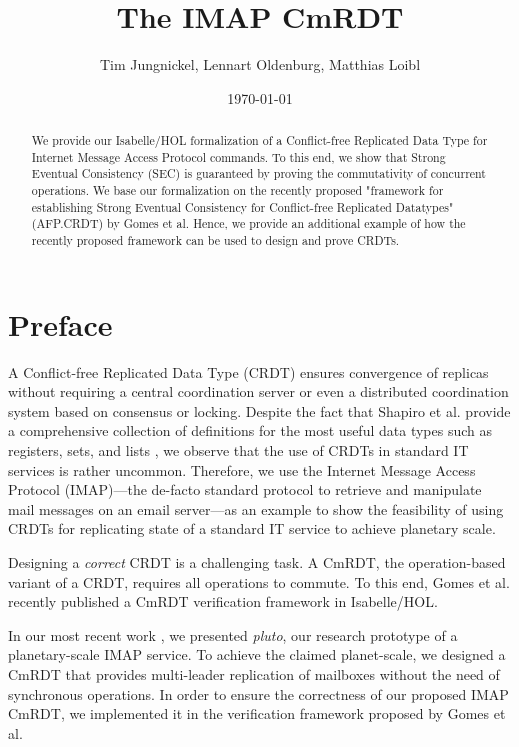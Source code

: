 \documentclass[11pt,a4paper, DIV=11]{article}
\title{The IMAP CmRDT}
\author{Tim Jungnickel, Lennart Oldenburg, Matthias Loibl}
\date{\today}
\begin{document}
\maketitle


\begin{abstract}
We provide our Isabelle/HOL formalization of a Conflict-free Replicated Data Type
for Internet Message Access Protocol commands. To this end, we show that Strong
Eventual Consistency (SEC) is guaranteed by proving the commutativity of concurrent
operations. We base our formalization on the recently proposed "framework for
establishing Strong Eventual Consistency for Conflict-free Replicated Datatypes"
(AFP.CRDT) by Gomes et al{.} Hence, we provide an additional example of how the
recently proposed framework can be used to design and prove CRDTs.
\end{abstract}


\tableofcontents


\section{Preface}

A Conflict-free Replicated Data Type (CRDT) \cite{shapiro_crdt} ensures
convergence of replicas without requiring a central coordination server or
even a distributed coordination system based on consensus or locking.
Despite the fact that Shapiro et al{.} provide a comprehensive collection
of definitions for the most useful data types such as registers, sets, and
lists \cite{shapiro_report}, we observe that the use of CRDTs in standard IT
services is rather uncommon. Therefore, we use the Internet Message Access
Protocol (IMAP)---the de-facto standard protocol to retrieve and manipulate mail
messages on an email server---as an example to show the feasibility of using
CRDTs for replicating state of a standard IT service to achieve planetary scale.

Designing a \emph{correct} CRDT is a challenging task. A CmRDT, the
operation-based variant of a CRDT, requires all operations to commute.
To this end, Gomes et al{.} recently published a CmRDT verification
framework \cite{gomes_crdtafp} in Isabelle/HOL.

In our most recent work \cite{pluto}, we presented \emph{pluto}, our research
prototype of a planetary-scale IMAP service. To achieve the claimed
planet-scale, we designed a CmRDT that provides multi-leader replication
of mailboxes without the need of synchronous operations. In order to ensure
the correctness of our proposed IMAP CmRDT, we implemented it in the
verification framework proposed by Gomes et al{.}
\end{document}
